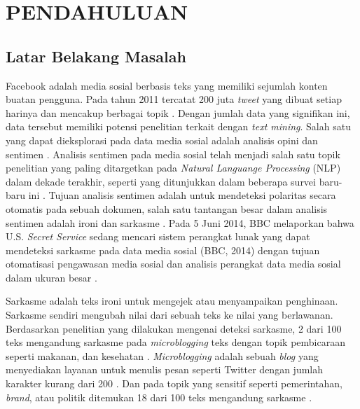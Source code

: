 \chapter{PENDAHULUAN}

\vspace{4.5pt}

\section{Latar Belakang Masalah} \label{sec:latar_belakang}
Facebook adalah media sosial berbasis teks yang memiliki sejumlah konten buatan pengguna. Pada tahun 2011 tercatat 200 juta \textit{tweet} yang dibuat setiap harinya dan mencakup berbagai topik \cite{1}. Dengan jumlah data yang signifikan ini, data tersebut memiliki potensi penelitian terkait dengan \textit{text mining}. Salah satu yang dapat dieksplorasi pada data media sosial adalah analisis opini dan sentimen \cite{1}. Analisis sentimen pada media sosial telah menjadi salah satu topik penelitian yang paling ditargetkan pada \textit{Natural Languange Processing} (NLP) dalam dekade terakhir, seperti yang ditunjukkan dalam beberapa survei baru-baru ini \cite{2}. Tujuan analisis sentimen adalah untuk mendeteksi polaritas secara otomatis pada sebuah dokumen, salah satu tantangan besar dalam analisis sentimen adalah ironi dan sarkasme \cite{3}. Pada 5 Juni 2014, BBC melaporkan bahwa U.S. \textit{Secret 	Service} sedang mencari sistem perangkat lunak yang dapat mendeteksi sarkasme pada data media sosial (BBC, 2014) dengan tujuan otomatisasi pengawasan media sosial dan analisis perangkat data media sosial dalam ukuran besar \cite{4}.

Sarkasme adalah teks ironi untuk mengejek atau menyampaikan penghinaan. Sarkasme sendiri mengubah nilai dari sebuah teks ke nilai yang berlawanan. Berdasarkan penelitian yang dilakukan mengenai deteksi sarkasme, 2 dari 100 teks mengandung sarkasme pada \textit{microblogging} teks dengan topik pembicaraan seperti makanan, dan kesehatan \cite{5}. \textit{Microblogging} adalah sebuah \textit{blog} yang menyediakan layanan untuk menulis pesan seperti Twitter dengan jumlah karakter kurang dari 200 \cite{6}. Dan pada topik yang sensitif seperti pemerintahan, \textit{brand}, atau politik ditemukan 18 dari 100 teks mengandung sarkasme \cite{5}.

